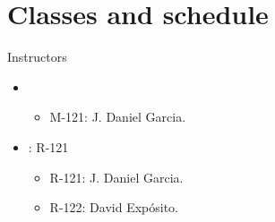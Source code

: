 \section{Classes and schedule}

\begin{frame}[t]{Instructors}
\begin{itemize}
  \item {}
    \begin{itemize}
      \item M-121: J. Daniel Garcia.
    \end{itemize}
  \item {}: R-121
    \begin{itemize}
      \item R-121: J. Daniel Garcia.
      \item R-122: David Expósito.
    \end{itemize}
\end{itemize}
\end{frame}
